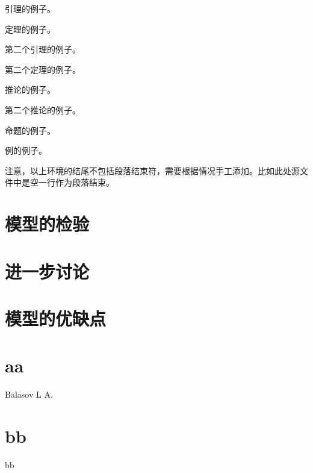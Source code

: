 \documentclass{cumcmart}
\begin{document}
\begin{lemma}
  引理的例子。
\end{lemma}

\begin{theorem}
  定理的例子。
\end{theorem}

\begin{lemma}
  第二个引理的例子。
\end{lemma}

\begin{theorem}
  第二个定理的例子。
\end{theorem}

\begin{corollary}
  推论的例子。
\end{corollary}

\begin{corollary}
  第二个推论的例子。
\end{corollary}

\begin{proposition}
  命题的例子。
\end{proposition}

\begin{example}
  例的例子。
\end{example}

    注意，以上环境的结尾不包括段落结束符，需要根据情况手工添加。比如此处源文件中是空一行作为段落结束。
\section{模型的检验}
\section{进一步讨论}
\section{模型的优缺点}







\section{aa}

\begin{thebibliography}{2}
 Balasov L A.
\end{thebibliography}

\section{bb}
\begin{thebibliography}{2}
 bb
\end{thebibliography}
\end{document}
